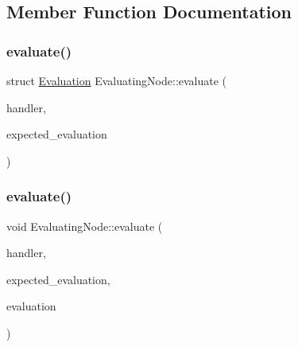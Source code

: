 \subsection{Member Function Documentation}
\mbox{\label{classEvaluatingNode_a49e3ccc15a4fc2d4ecd4d264c86dea5e}} 
\subsubsection{\texorpdfstring{evaluate()}{evaluate()}\hspace{0.1cm}{\footnotesize\ttfamily [1/2]}}
{\footnotesize\ttfamily struct \hyperlink{structEvaluation}{Evaluation} Evaluating\+Node\+::evaluate (\begin{DoxyParamCaption}\item[{\hyperlink{classSystemHandler}{System\+Handler} $\ast$}]{handler,  }\item[{\hyperlink{statics_8h_a6664c451ca7787483a7981cc1de68dbb}{E\+V\+A\+L\+U\+A\+T\+I\+O\+N\+\_\+\+T\+Y\+PE}}]{expected\+\_\+evaluation }\end{DoxyParamCaption})}

\mbox{\label{classEvaluatingNode_ae20449b7c2e423d64664503befd47ba0}} 
\subsubsection{\texorpdfstring{evaluate()}{evaluate()}\hspace{0.1cm}{\footnotesize\ttfamily [2/2]}}
{\footnotesize\ttfamily void Evaluating\+Node\+::evaluate (\begin{DoxyParamCaption}\item[{\hyperlink{classSystemHandler}{System\+Handler} $\ast$}]{handler,  }\item[{\hyperlink{statics_8h_a6664c451ca7787483a7981cc1de68dbb}{E\+V\+A\+L\+U\+A\+T\+I\+O\+N\+\_\+\+T\+Y\+PE}}]{expected\+\_\+evaluation,  }\item[{struct \hyperlink{structEvaluation}{Evaluation} $\ast$}]{evaluation }\end{DoxyParamCaption})}

\mbox{\label{classEvaluatingNode_abb86fa7334a5871f959b0633db3b5215}} 
